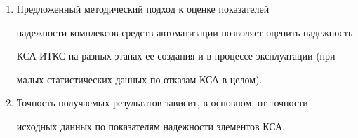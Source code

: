      \begin{enumerate}[1.]


     \item Предложенный методический подход к оценке показателей 


надежности комплексов средств автоматизации позволяет оценить надежность 


КСА ИТКС на разных этапах ее создания и в процессе эксплуатации (при 


малых статистических данных по отказам КСА в целом).


     \item Точность получаемых результатов зависит, в основном, от точности 


исходных данных по показателям надежности элементов КСА. 


     \end{enumerate}


     


